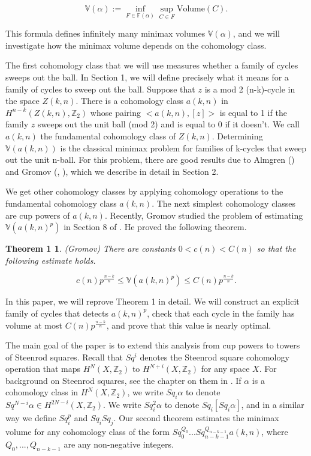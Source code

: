 \documentclass{amsart}
\newtheorem*{Theorem 1}{Theorem 1}
\newtheorem*{Theorem 2}{Theorem 2}
\newtheorem*{Theorem 1A}{Theorem 1A}
\newtheorem*{Theorem 2A}{Theorem 2A}
\newtheorem*{vanishing lemma}{Vanishing Lemma}
\numberwithin{equation}{section}
\begin{document}
$$\mathbb{V}(\alpha) := \inf_{F \in \mathbb{F}(\alpha)} \sup_{C
\in F} \textrm{Volume} (C).$$

This formula defines infinitely many minimax volumes $\mathbb{V}(\alpha)$,
and we will investigate how the minimax volume depends on the cohomology
class.

The first cohomology class that we will use measures whether
a family of cycles sweeps out the ball.  In Section 1, we will
define precisely what it means for a family of cycles to sweep out
the ball.  Suppose that $z$ is a
mod 2 (n-k)-cycle in the space $Z(k,n)$.  There is a cohomology
class $a(k,n)$ in $H^{n-k}(Z(k,n), \mathbb{Z}_2)$ whose pairing 
$<a(k,n), [z] >$ is equal to 1 if
the family $z$ sweeps out the unit ball (mod 2) and is equal to 0 if it
doesn't.  We call $a(k,n)$ the fundamental
cohomology class of $Z(k,n)$.  Determining $\mathbb{V}(a(k,n))$
is the classical minimax problem for families of k-cycles that
sweep out the unit n-ball.  For this problem, there are good
results due to Almgren (\cite{A2}) and Gromov
(\cite{G}, \cite{G3}), which we describe in detail in Section 2.

We get other cohomology classes by applying cohomology operations
to the fundamental cohomology class $a(k,n)$.  The next simplest
cohomology classes are cup powers of $a(k,n)$.  Recently, Gromov studied
the problem of estimating $\mathbb{V}( a(k,n)^p )$ in Section 8
of \cite{G3}.  He proved the following theorem.

\begin{Theorem 1} (Gromov) There are constants $0 < c(n) < C(n)$  so that
the following estimate holds.

$$c(n) p^{\frac{n-k}{n}} \le \mathbb{V}(a(k,n)^p) \le C(n)
p^{\frac{n-k}{n}}.$$

\end{Theorem 1}

In this paper, we will reprove Theorem 1 in detail.  We
will construct an explicit family of cycles that detects $a(k,n)^p$,
check that each cycle in the family has volume at most $C(n) p^{\frac{n-k}{n}}$,
and prove that this value is nearly optimal.

The main goal of the paper is to extend this analysis from cup powers
to towers of Steenrod squares.  Recall that $Sq^i$ 
denotes the Steenrod square cohomology operation that maps 
$H^N(X, \mathbb{Z}_2)$ to $H^{N+i}(X, \mathbb{Z}_2)$ 
for any space $X$.  For background on
Steenrod squares, see the chapter on them in \cite{H}.  If
$\alpha$ is a cohomology class in $H^N(X, \mathbb{Z}_2)$, we
write $Sq_i \alpha$ to denote $Sq^{N-i} \alpha \in H^{2N-i}(X,
\mathbb{Z}_2)$.  We write $Sq_i^2 \alpha$ to denote $Sq_i [Sq_i
\alpha]$, and in a similar way we define $Sq_i^p$ and $Sq_i Sq_j$.
Our second theorem estimates the minimax volume for any cohomology class
of the form $Sq_0^{Q_0} ... Sq_{n-k-1}^{Q_{n-k-1}} a(k,n)$, where
$Q_0, ..., Q_{n-k-1}$ are any non-negative integers.
\end{document}
